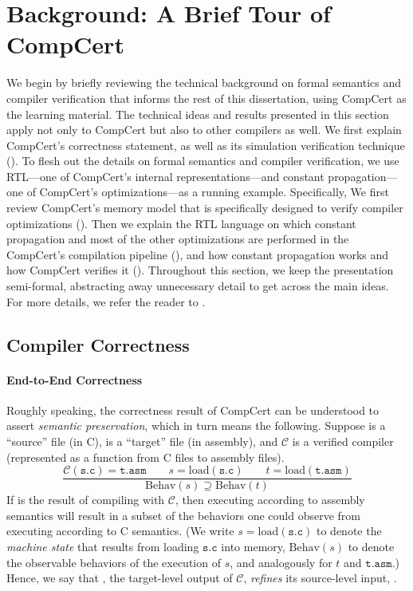 \section{Background: A Brief Tour of CompCert}
\label{sec:background}

We begin by briefly reviewing the technical background on formal semantics and compiler verification
that informs the rest of this dissertation, using CompCert as the learning material.  The technical
ideas and results presented in this section apply not only to CompCert but also to other compilers
as well.  We first explain CompCert's correctness statement, as well as its simulation verification
technique ().  To flesh out the details on formal semantics and
compiler verification, we use RTL---one of CompCert's internal representations---and constant
propagation---one of CompCert's optimizations---as a running example.  Specifically, We first review
CompCert's memory model that is specifically designed to verify compiler optimizations
().  Then we explain the RTL language on which constant propagation and
most of the other optimizations are performed in the CompCert's compilation pipeline
(), and how constant propagation works and how CompCert verifies it
().  Throughout this section, we keep the presentation semi-formal,
abstracting away unnecessary detail to get across the main ideas.  For more details, we refer the
reader to \cite{compcert, compcert-memory-model}.


\subsection{Compiler Correctness}
\label{sec:background:correctness}

\paragraph{End-to-End Correctness}

Roughly speaking, the correctness result of CompCert can be understood to assert \emph{semantic
  preservation}, which in turn means the following.  Suppose  is a ``source'' file (in C),
 is a ``target'' file (in assembly), and $\mathcal{C}$ is a verified compiler
(represented as a function from C files to assembly files).
\[
\frac{
\mathcal{C}(\mathtt{s.c}) = \mathtt{t.asm} \qquad
s = \mathrm{load}(\mathtt{s.c})\qquad
t = \mathrm{load}(\mathtt{t.asm})}
{\mathrm{Behav}(s) \supseteq \mathrm{Behav}(t)}
\]
If  is the result of compiling  with $\mathcal{C}$, then executing
 according to assembly semantics will result in a subset of the behaviors one could
observe from executing  according to C semantics.  (We write
$s = \mathrm{load}(\mathtt{s.c})$ to denote the \emph{machine state} that results from loading
$\mathtt{s.c}$ into memory, $\mathrm{Behav}(s)$ to denote the observable behaviors of the execution
of $s$, and analogously for $t$ and $\mathtt{t.asm}$.)  Hence, we say that , the
target-level output of $\mathcal{C}$, \emph{refines} its source-level input, .

